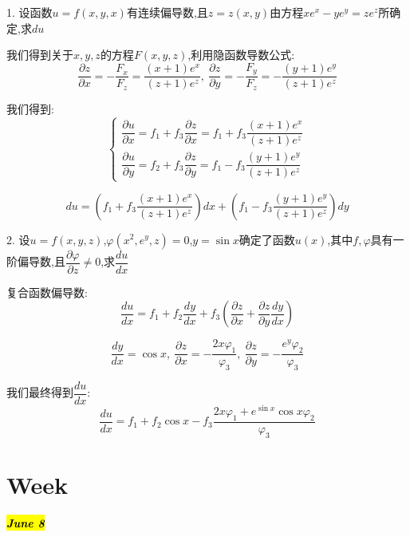 1. 设函数$u=f(x,y,x)$有连续偏导数,且$z=z(x,y)$由方程$xe^x-ye^y=ze^z$所确定,求$du$
\begin{solution}
	
	我们得到关于$x,y,z$的方程$F(x,y,z)$,利用隐函数导数公式: 
	$$\dfrac{\partial z}{\partial x}=-\dfrac{F_{x}}{F_{z}}=\dfrac{(x+1)e^x}{(z+1)e^z},\ \dfrac{\partial z}{\partial y}=-\dfrac{F_{y}}{F_{z}}=-\dfrac{(y+1)e^y}{(z+1)e^z}$$
	
	我们得到: 
	$$\left\lbrace 
	\begin{array}{l}
		\dfrac{\partial u}{\partial x}=f_{1}+f_{3}\dfrac{\partial z}{\partial x}=f_{1}+f_{3}\dfrac{(x+1)e^x}{(z+1)e^z}\\
		\dfrac{\partial u}{\partial y}=f_{2}+f_{3}\dfrac{\partial z}{\partial y}=f_{1}-f_{3}\dfrac{(y+1)e^y}{(z+1)e^z}
	\end{array}
	\right. $$
	
	$$du=(f_{1}+f_{3}\dfrac{(x+1)e^x}{(z+1)e^z})dx+(f_{1}-f_{3}\dfrac{(y+1)e^y}{(z+1)e^z})dy$$
\end{solution}

2. 设$u=f(x,y,z)$,$\varphi(x^2,e^y,z)=0$,$y=\sin x$确定了函数$u(x)$,其中$f,\varphi$具有一阶偏导数,且$\dfrac{\partial \varphi}{\partial z}\neq 0$,求$\dfrac{du}{dx}$
\begin{solution}
	
	复合函数偏导数: 
	$$\dfrac{du}{dx}=f_{1}+f_{2}\dfrac{dy}{dx}+f_{3}(\dfrac{\partial z}{\partial x}+\dfrac{\partial z}{\partial y}\dfrac{dy}{dx})$$
	
	$$\dfrac{dy}{dx}=\cos x,\ \dfrac{\partial z}{\partial x}=-\dfrac{2x\varphi_{1}}{\varphi_{3}},\ \dfrac{\partial z}{\partial y}=-\dfrac{e^y\varphi_{2}}{\varphi_{3}}$$
	
	我们最终得到$\dfrac{du}{dx}$: 
	$$\dfrac{du}{dx}=f_{1}+f_{2}\cos x-f_{3}\dfrac{2x\varphi_{1}+e^{\sin x}\cos x \varphi_{2}}{\varphi_{3}}$$
\end{solution}

\section{Week }
\hl{\textbf{\textit{June 8}}}

